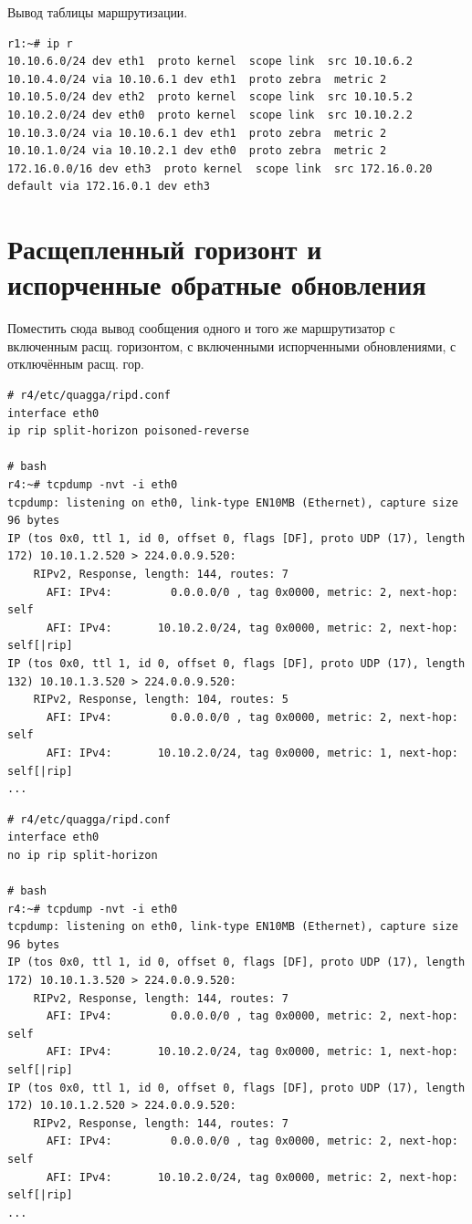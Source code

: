 \documentclass[a4paper,12pt]{article}
\begin{document}
Вывод таблицы маршрутизации.

\begin{Verbatim}
r1:~# ip r
10.10.6.0/24 dev eth1  proto kernel  scope link  src 10.10.6.2 
10.10.4.0/24 via 10.10.6.1 dev eth1  proto zebra  metric 2 
10.10.5.0/24 dev eth2  proto kernel  scope link  src 10.10.5.2 
10.10.2.0/24 dev eth0  proto kernel  scope link  src 10.10.2.2 
10.10.3.0/24 via 10.10.6.1 dev eth1  proto zebra  metric 2 
10.10.1.0/24 via 10.10.2.1 dev eth0  proto zebra  metric 2 
172.16.0.0/16 dev eth3  proto kernel  scope link  src 172.16.0.20 
default via 172.16.0.1 dev eth3 
\end{Verbatim}


\section{Расщепленный горизонт и испорченные обратные обновления}

Поместить сюда вывод сообщения одного и того же маршрутизатор с включенным расщ. горизонтом, с включенными испорченными обновлениями, с отключённым расщ. гор.

\begin{Verbatim}
# r4/etc/quagga/ripd.conf
interface eth0
ip rip split-horizon poisoned-reverse

# bash
r4:~# tcpdump -nvt -i eth0
tcpdump: listening on eth0, link-type EN10MB (Ethernet), capture size 96 bytes
IP (tos 0x0, ttl 1, id 0, offset 0, flags [DF], proto UDP (17), length 172) 10.10.1.2.520 > 224.0.0.9.520: 
	RIPv2, Response, length: 144, routes: 7
	  AFI: IPv4:         0.0.0.0/0 , tag 0x0000, metric: 2, next-hop: self
	  AFI: IPv4:       10.10.2.0/24, tag 0x0000, metric: 2, next-hop: self[|rip]
IP (tos 0x0, ttl 1, id 0, offset 0, flags [DF], proto UDP (17), length 132) 10.10.1.3.520 > 224.0.0.9.520: 
	RIPv2, Response, length: 104, routes: 5
	  AFI: IPv4:         0.0.0.0/0 , tag 0x0000, metric: 2, next-hop: self
	  AFI: IPv4:       10.10.2.0/24, tag 0x0000, metric: 1, next-hop: self[|rip]
...
\end{Verbatim}

\begin{Verbatim}
# r4/etc/quagga/ripd.conf
interface eth0
no ip rip split-horizon

# bash
r4:~# tcpdump -nvt -i eth0
tcpdump: listening on eth0, link-type EN10MB (Ethernet), capture size 96 bytes
IP (tos 0x0, ttl 1, id 0, offset 0, flags [DF], proto UDP (17), length 172) 10.10.1.3.520 > 224.0.0.9.520: 
	RIPv2, Response, length: 144, routes: 7
	  AFI: IPv4:         0.0.0.0/0 , tag 0x0000, metric: 2, next-hop: self
	  AFI: IPv4:       10.10.2.0/24, tag 0x0000, metric: 1, next-hop: self[|rip]
IP (tos 0x0, ttl 1, id 0, offset 0, flags [DF], proto UDP (17), length 172) 10.10.1.2.520 > 224.0.0.9.520: 
	RIPv2, Response, length: 144, routes: 7
	  AFI: IPv4:         0.0.0.0/0 , tag 0x0000, metric: 2, next-hop: self
	  AFI: IPv4:       10.10.2.0/24, tag 0x0000, metric: 2, next-hop: self[|rip]
...
\end{Verbatim}
\end{document}
